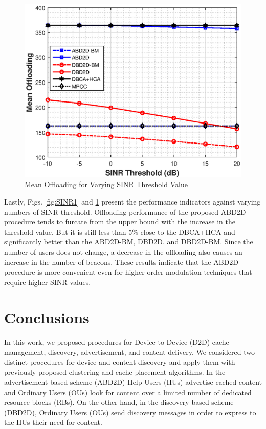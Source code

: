 \documentclass[10pt,a4paper,twocolumn]{article}
\begin{document}
\begin{figure}[!htb]
	\centering
	\includegraphics[width=\columnwidth]{SINR2.eps}
	\caption{Mean Offloading for Varying SINR Threshold Value}
	\label{fig:SINR2}
\end{figure}

Lastly, Figs.  \ref{fig:SINR1} and \ref{fig:SINR2} present the performance indicators against varying numbers of SINR threshold. Offloading performance of the proposed ABD2D procedure tends to furcate from the upper bound with the increase in the threshold value. But it is still less than 5\% close to the DBCA+HCA and significantly better than the ABD2D-BM, DBD2D, and DBD2D-BM. Since the number of users does not change, a decrease in the offloading also causes an increase in the number of beacons. These results indicate that the ABD2D procedure is more convenient even for higher-order modulation techniques that require higher SINR values.

\section{Conclusions}
\label{sec:sec7}
In this work, we proposed procedures for Device-to-Device (D2D) cache management, discovery, advertisement, and content delivery. We considered two distinct procedures for device and content discovery and apply them with previously proposed clustering and cache placement algorithms. In the advertisement based scheme (ABD2D) Help Users (HUs) advertise cached content and Ordinary Users (OUs) look for content over a limited number of dedicated resource blocks (RBs). On the other hand, in the discovery based scheme (DBD2D), Ordinary Users (OUs) send discovery messages in order to express to the HUs their need for content.
\end{document}
